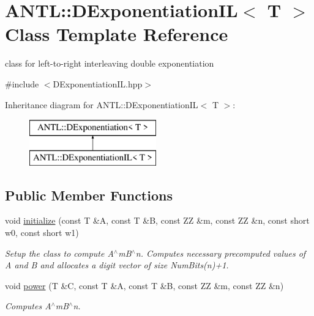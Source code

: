 \hypertarget{classANTL_1_1DExponentiationIL}{\section{A\-N\-T\-L\-:\-:D\-Exponentiation\-I\-L$<$ T $>$ Class Template Reference}
\label{classANTL_1_1DExponentiationIL}
}


class for left-\/to-\/right interleaving double exponentiation  




{\ttfamily \#include $<$D\-Exponentiation\-I\-L.\-hpp$>$}

Inheritance diagram for A\-N\-T\-L\-:\-:D\-Exponentiation\-I\-L$<$ T $>$\-:\begin{figure}[H]
\begin{center}
\leavevmode
\includegraphics[height=2.000000cm]{d5/d75/classANTL_1_1DExponentiationIL}
\end{center}
\end{figure}
\subsection*{Public Member Functions}
\begin{DoxyCompactItemize}
\item 
void \hyperlink{classANTL_1_1DExponentiationIL_aca114a667408c7058246b3c17890e82c}{initialize} (const T \&A, const T \&B, const Z\-Z \&m, const Z\-Z \&n, const short w0, const short w1)
\begin{DoxyCompactList}\small\item\em Setup the class to compute A$^\wedge$m\-B$^\wedge$n. Computes necessary precomputed values of A and B and allocates a digit vector of size Num\-Bits(n)+1. \end{DoxyCompactList}\item 
void \hyperlink{classANTL_1_1DExponentiationIL_ae3f1e9fee3ffcee4e919b324195304d8}{power} (T \&C, const T \&A, const T \&B, const Z\-Z \&m, const Z\-Z \&n)
\begin{DoxyCompactList}\small\item\em Computes A$^\wedge$m\-B$^\wedge$n. \end{DoxyCompactList}\end{DoxyCompactItemize}
